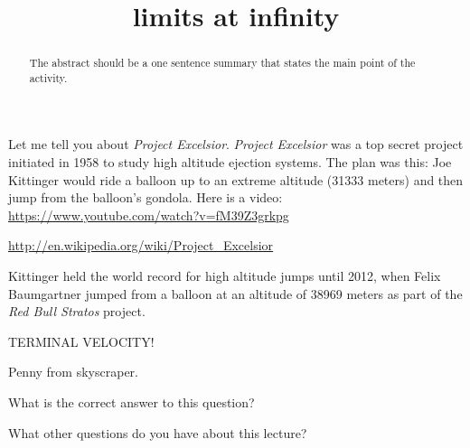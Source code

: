 \documentclass{ximera}
\title{limits at infinity}
\begin{document}
\begin{abstract}
  The abstract should be a one sentence summary that states the main point of the activity.
\end{abstract}
\maketitle

Let me tell you about \textit{Project Excelsior}. \textit{Project
  Excelsior} was a top secret project initiated in 1958 to study high
altitude ejection systems. The plan was this: Joe Kittinger would ride
a balloon up to an extreme altitude (31333 meters) and then jump from
the balloon's gondola. Here is a video:
\url{https://www.youtube.com/watch?v=fM39Z3grkpg}

\url{http://en.wikipedia.org/wiki/Project_Excelsior}

Kittinger held the world record for high altitude jumps until 2012, when Felix Baumgartner jumped from a balloon at an altitude of 38969 meters as part of the \textit{Red Bull Stratos} project. 

TERMINAL VELOCITY!


Penny from skyscraper. 

\begin{question}
  What is the correct answer to this question?

  \begin{solution}
    \begin{multiple-choice}
    \end{multiple-choice}  
  \end{solution}
\end{question}

What other questions do you have about this lecture?
\begin{free-response}
\end{free-response}
\end{document}
